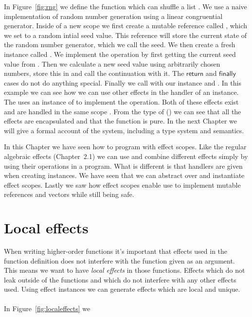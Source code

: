 In Figure~\ref{fig:rng} we define the function  which can shuffle a list .
We use a naive implementation of random number generation using a linear congruential generator.
Inside of a new scope  we first create a mutable reference called , which we set to a random intial seed value.
This reference will store the current state of the random number generator, which we call the seed.
We then create a fresh  instance called .
We implement the  operation by first getting the current seed value from .
Then we calculate a new seed value using arbitrarily chosen numbers, store this in  and call the continuation with it.
The $\mathsf{return}$ and $\mathsf{finally}$ cases do not do anything special.
Finally we call  with our  instance and .
In this example we can see how we can use other effects in the handler of an instance.
The  uses an instance of  to implement the  operation.
Both of these effects exist and are handled in the same scope .
From the type of  () we can see that all the effects are encapsulated and that the function is pure.
In the next Chapter we will give a formal account of the system, including a type system and semantics.

In this Chapter we have seen how to program with effect scopes.
Like the regular algebraic effects (Chapter~2.1) we can use and combine different effects simply by using their operations in a program.
What is different is that handlers are given when creating instances.
We have seen that we can abstract over and instantiate effect scopes.
Lastly we saw how effect scopes enable use to implement mutable references and vectors while still being safe.

\iffalse
\section{Local effects}
When writing higher-order functions it's important that effects used in the function definition does not interfere with the function given as an argument.
This means we want to have \emph{local effects} in those functions.
Effects which do not leak outside of the functions and which do not interfere with any other effects used.
Using effect instances we can generate effects which are local and unique.
\\\\
In Figure~\ref{fig:localeffects} we 

